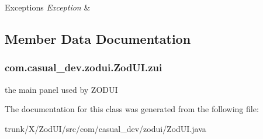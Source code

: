\begin{DoxyExceptions}{Exceptions}
{\em Exception} & \\
\hline
\end{DoxyExceptions}


\subsection{Member Data Documentation}
\hypertarget{classcom_1_1casual__dev_1_1zodui_1_1_zod_u_i_a32e53f2c13b6aee68af51ddaf39671bc}{
\subsubsection[{zui}]{ com.\-casual\-\_\-dev.\-zodui.\-Zod\-U\-I.\-zui}}\label{classcom_1_1casual__dev_1_1zodui_1_1_zod_u_i_a32e53f2c13b6aee68af51ddaf39671bc}
the main panel used by Z\-O\-D\-U\-I 

The documentation for this class was generated from the following file\-:\begin{DoxyCompactItemize}
\item 
trunk/\-X/\-Zod\-U\-I/src/com/casual\-\_\-dev/zodui/Zod\-U\-I.\-java\end{DoxyCompactItemize}
